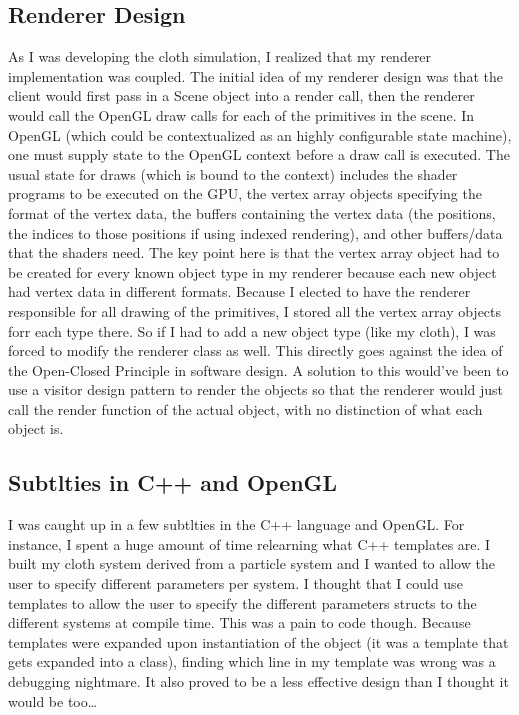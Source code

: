 \documentclass[letterpaper, 10 pt, conference]{ieeeconf}  %
\begin{document}
\subsection{Renderer Design}
        As I was developing the cloth simulation, I realized that my renderer implementation was coupled. The initial idea of my renderer design was that the client would first pass in a Scene object into a render call, then the renderer would call the OpenGL draw calls for each of the primitives in the scene. In OpenGL (which could be contextualized as an highly configurable state machine), one must supply state to the OpenGL context before a draw call is executed. The usual state for draws (which is bound to the context) includes the shader programs to be executed on the GPU, the vertex array objects specifying the format of the vertex data, the buffers containing the vertex data (the positions, the indices to those positions if using indexed rendering), and other buffers/data that the shaders need. The key point here is that the vertex array object had to be created for every known object type in my renderer because each new object had vertex data in different formats. Because I elected to have the renderer responsible for all drawing of the primitives, I stored all the vertex array objects forr each type there. So if I had to add a new object type (like my cloth), I was forced to modify the renderer class as well. This directly goes against the idea of the Open-Closed Principle in software design. A solution to this would've been to use a visitor design pattern to render the objects so that the renderer would just call the render function of the actual object, with no distinction of what each object is. 


\subsection{Subtlties in C++ and OpenGL}
        I was caught up in a few subtlties in the C++ language and OpenGL. For instance, I spent a huge amount of time relearning what C++ templates are. I built my cloth system derived from a particle system and I wanted to allow the user to specify different parameters per system. I thought that I could use templates to allow the user to specify the different parameters structs to the different systems at compile time. This was a pain to code though. Because templates were expanded upon instantiation of the object (it was a template that gets expanded into a class), finding which line in my template was wrong was a debugging nightmare. It also proved to be a less effective design than I thought it would be too\dots
        
\end{document}
